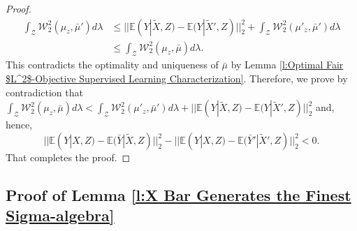 \documentclass[twoside,11pt]{article}
\begin{document}
\begin{proof}
\begin{align*}
\int_{\mathcal{Z}} \mathcal{W}_2^2(\mu_z, \bar{\mu}')d\lambda & \leq ||\mathbb{E}(Y|\tilde{X},Z) - \mathbb{E}(Y|\tilde{X}',Z)||_2^2 + \int_{\mathcal{Z}} \mathcal{W}_2^2(\mu'_z, \bar{\mu}')d\lambda\\
& \leq \int_{\mathcal{Z}} \mathcal{W}_2^2(\mu_z, \bar{\mu})d\lambda.
\end{align*}
This contradicts the optimality and uniqueness of $\bar{\mu}$ by Lemma \ref{l:Optimal Fair $L^2$-Objective Supervised Learning Characterization}. Therefore, we prove by contradiction that $\int_{\mathcal{Z}} \mathcal{W}_2^2(\mu_z, \bar{\mu})d\lambda < \int_{\mathcal{Z}} \mathcal{W}_2^2(\mu'_z, \bar{\mu}')d\lambda + ||\mathbb{E}(Y|\tilde{X},Z) - \mathbb{E}(Y|\tilde{X}',Z)||_2^2$ and, hence, $$||\mathbb{E}(Y|X,Z) - \mathbb{E}(\bar{Y}|\tilde{X},Z)||_2^2 - ||\mathbb{E}(Y|X,Z) - \mathbb{E}(\bar{Y}'|\tilde{X}',Z)||_2^2 < 0.$$ That completes the proof.
\end{proof}

\subsection{Proof of Lemma \ref{l:X Bar Generates the Finest Sigma-algebra}}
\end{document}
